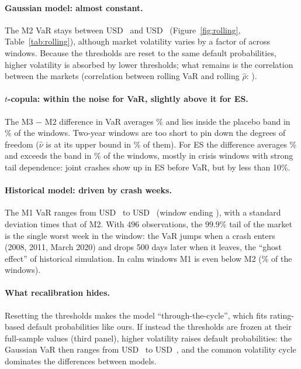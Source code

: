 \paragraph{Gaussian model: almost constant.}
The M2 VaR stays between USD~ and USD~ (Figure~\ref{fig:rolling}, Table~\ref{tab:rolling}), although market volatility varies by a factor of  across windows. Because the thresholds are reset to the same default probabilities, higher volatility is absorbed by lower thresholds; what remains is the correlation between the markets (correlation between rolling VaR and rolling $\hat\rho$: ).

\paragraph{$t$-copula: within the noise for VaR, slightly above it for ES.}
The M3 $-$ M2 difference in VaR averages \% and lies inside the placebo band in \% of the windows. Two-year windows are too short to pin down the degrees of freedom ($\hat\nu$ is at its upper bound in \% of them). For ES the difference averages \% and exceeds the band in \% of the windows, mostly in crisis windows with strong tail dependence: joint crashes show up in ES before VaR, but by less than 10\%.

\paragraph{Historical model: driven by crash weeks.}
The M1 VaR ranges from USD~ to USD~ (window ending ), with a standard deviation  times that of M2. With $496$ observations, the $99.9\%$ tail of the market is the single worst week in the window: the VaR jumps when a crash enters (2008, 2011, March 2020) and drops 500 days later when it leaves, the ``ghost effect'' of historical simulation. In calm windows M1 is even below M2 (\% of the windows).

\paragraph{What recalibration hides.}
Resetting the thresholds makes the model ``through-the-cycle'', which fits rating-based default probabilities like ours. If instead the thresholds are frozen at their full-sample values (third panel), higher volatility raises default probabilities: the Gaussian VaR then ranges from USD~ to USD~, and the common volatility cycle dominates the differences between models.
